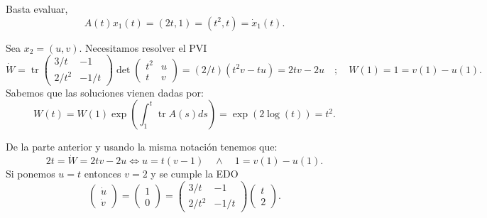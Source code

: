 \documentclass[10pt]{article}
\DeclareMathOperator\tr{tr}
\begin{document}
\begin{plist}
\item Basta evaluar,
\[
    A(t) x_1(t) = (2t, 1) = (t^2, t) = \dot{x}_1(t)
.\]
\item Sea \(x_2 = (u,v)\). Necesitamos resolver el PVI
\[
    \dot{W} =
    \tr \begin{pmatrix}
    3/t & -1\\
    2/t^2 & -1/t
    \end{pmatrix}
    \det
    \begin{pmatrix}
    t^2 & u\\
    t & v
    \end{pmatrix}
    =
    (2/t) (t^2 v - t u)
    =
    2tv - 2u
    \quad;\quad
    W(1) = 1 = v(1) - u(1)
.\]
Sabemos que las soluciones vienen dadas por:
\[
    W(t)
    =
    W(1) \exp\left(\int_{1}^{t} \tr A(s) ds \right)
    =
    \exp \left(2 \log(t) \right)
    =
    t^2
.\]
\item De la parte anterior y usando la misma notación tenemos que:
\[
    2t = \dot{W} = 2tv - 2u
    \iff
    u = t(v-1)
    \quad\land\quad
    1 = v(1) - u(1)
.\]
Si ponemos \(u=t\) entonces \(v = 2\) y se cumple la EDO
\[
    \begin{pmatrix} \dot{u}\\ \dot{v} \end{pmatrix}
    =
    \begin{pmatrix} 1 \\ 0 \end{pmatrix}
    =
    \begin{pmatrix}
    3/t & -1\\
    2/t^2 & -1/t
    \end{pmatrix}
    \begin{pmatrix} t\\ 2 \end{pmatrix}
.\]


\end{plist}
\end{document}
